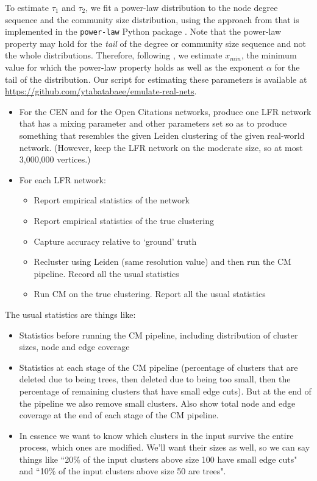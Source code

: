 \documentclass[a4paper]{article}   	%
\begin{document}
To estimate $\tau_1$ and $\tau_2$, we fit a power-law distribution to the node degree sequence and the community size distribution, using the approach from \citep{clauset2009power} that is implemented in the \texttt{power-law} Python package \citep{alstott2014powerlaw}. Note that the power-law property may hold for the \textit{tail} of the degree or community size sequence and not the whole distributions. Therefore, following \citep{clauset2009power}, we estimate $x_{min}$, the minimum value for which the power-law property holds as well as the exponent $\alpha$ for the tail of the distribution. Our script for estimating these parameters is available at \href{https://github.com/ytabatabaee/emulate-real-nets}{https://github.com/ytabatabaee/emulate-real-nets}.

\begin{itemize}
\item For  the CEN and  for the Open Citations networks, produce one LFR network  that has a mixing parameter and other
parameters set so as to produce something that resembles the given Leiden clustering of the given real-world network. (However, keep the LFR network
on the moderate size, so at most 3,000,000 vertices.)

\item
For each LFR network:
\begin{itemize}
\item Report empirical statistics of the network
\item Report empirical statistics of the true clustering
\item Capture accuracy relative to `ground' truth
\item
Recluster using Leiden (same resolution value) and then run the CM pipeline.
Record all the usual statistics
\item Run CM on the true clustering.
Report all the usual statistics
\end{itemize}
\end{itemize}

\noindent
The usual statistics are things like:
\begin{itemize}
\item Statistics before running the CM pipeline, including distribution of cluster sizes, node and edge coverage
\item Statistics at each stage of the CM pipeline (percentage of clusters that are deleted due to being trees,
then deleted due to being too small, then the percentage of remaining clusters  that have small edge cuts).
But at the end of the pipeline we also remove small clusters.
Also show total node and edge coverage at the end of each stage of the CM pipeline.
\item
In essence we want to know which clusters in the input survive the entire process, which ones are modified.
We'll want their sizes as well, so we can say things like ``20\% of the input clusters above size 100 have small edge cuts" and
``10\% of the input clusters above size 50 are trees".
\end{itemize}
\end{document}
